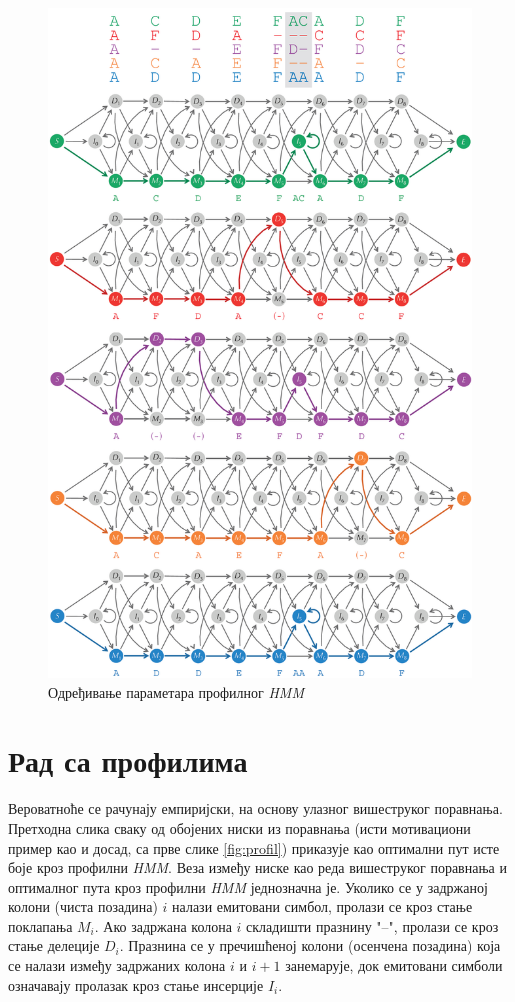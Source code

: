 \documentclass[12pt,oneside]{memoir}
\begin{document}
\begin{CJK}{UTF8}{ipxm}
\begin{figure}[H]
  \centering
  \includegraphics[height=.97\textheight]{prof_param.png}
  \caption{Одређивање параметара профилног \textit{HMM}\cite{compeau2015}}
  \label{fig:prof_param}
\end{figure}

\section{Рад са профилима}
Вероватноће се рачунају емпиријски, на основу улазног вишеструког поравнања. Претходна слика сваку од обојених ниски из поравнања (исти мотивациони пример као и досад, са прве слике \ref{fig:profil}) приказује као оптимални пут исте боје кроз профилни \textit{HMM}. Веза између ниске као реда вишеструког поравнања и оптималног пута кроз профилни \textit{HMM} једнозначна је. Уколико се у задржаној колони (чиста позадина) $i$ налази емитовани симбол, пролази се кроз стање поклапања $M_i$. Ако задржана колона $i$ складишти празнину "--", пролази се кроз стање делеције $D_i$. Празнина се у пречишћеној колони (осенчена позадина) која се налази између задржаних колона $i$ и $i+1$ занемарује, док емитовани симболи означавају пролазак кроз стање инсерције $I_i$.


\end{CJK}
\end{document}
